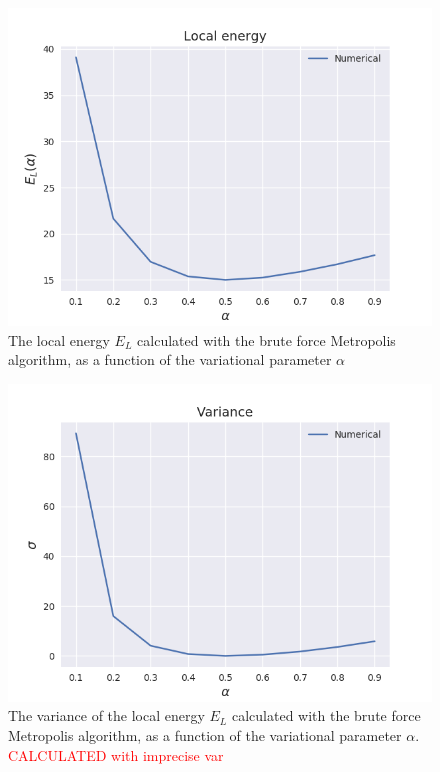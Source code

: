 \documentclass[norsk,a4paper,12pt]{article}
\begin{document}
\begin{figure} [H]
	\centering
	\includegraphics[scale=0.65]{images/energy.png}
	\caption{The local energy $E_L$ calculated with the brute force Metropolis algorithm, as a function of the variational parameter $\alpha$}
	\label{fig:EL_as_func_of_alpha}
\end{figure} 

\begin{figure} [H]
	\centering
	\includegraphics[scale=0.65]{images/variance.png}
	\caption{The variance of the local energy $E_L$ calculated with the brute force Metropolis algorithm, as a function of the variational parameter $\alpha$. \textcolor{red}{CALCULATED with imprecise var}}
	\label{fig:variance_EL_as_func_of_alpha}
\end{figure} 
\end{document}
